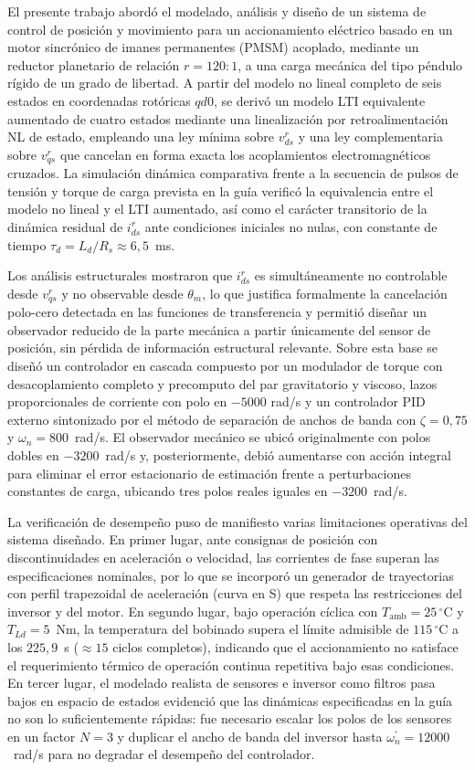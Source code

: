 \documentclass[12pt, a4paper,journal, onecolumn, compsoc]{IEEEtran}
\begin{document}
El presente trabajo abordó el modelado, análisis y diseño de un sistema de control de posición y movimiento para un accionamiento eléctrico basado en un motor sincrónico de imanes permanentes (PMSM) acoplado, mediante un reductor planetario de relación $r=120{:}1$, a una carga mecánica del tipo péndulo rígido de un grado de libertad. A partir del modelo no lineal completo de seis estados en coordenadas rotóricas $qd0$, se derivó un modelo LTI equivalente aumentado de cuatro estados mediante una linealización por retroalimentación NL de estado, empleando una ley mínima sobre $v_{ds}^{r}$ y una ley complementaria sobre $v_{qs}^{r}$ que cancelan en forma exacta los acoplamientos electromagnéticos cruzados. La simulación dinámica comparativa frente a la secuencia de pulsos de tensión y torque de carga prevista en la guía verificó la equivalencia entre el modelo no lineal y el LTI aumentado, así como el carácter transitorio de la dinámica residual de $i_{ds}^{r}$ ante condiciones iniciales no nulas, con constante de tiempo $\tau_d = L_d/R_s \approx 6{,}5$~ms.

Los análisis estructurales mostraron que $i_{ds}^{r}$ es simultáneamente no controlable desde $v_{qs}^{r}$ y no observable desde $\theta_m$, lo que justifica formalmente la cancelación polo-cero detectada en las funciones de transferencia y permitió diseñar un observador reducido de la parte mecánica a partir únicamente del sensor de posición, sin pérdida de información estructural relevante. Sobre esta base se diseñó un controlador en cascada compuesto por un modulador de torque con desacoplamiento completo y precomputo del par gravitatorio y viscoso, lazos proporcionales de corriente con polo en $-5000$ rad/s y un controlador PID externo sintonizado por el método de separación de anchos de banda con $\zeta = 0{,}75$ y $\omega_n = 800$~rad/s. El observador mecánico se ubicó originalmente con polos dobles en $-3200$~rad/s y, posteriormente, debió aumentarse con acción integral para eliminar el error estacionario de estimación frente a perturbaciones constantes de carga, ubicando tres polos reales iguales en $-3200$~rad/s.

La verificación de desempeño puso de manifiesto varias limitaciones operativas del sistema diseñado. En primer lugar, ante consignas de posición con discontinuidades en aceleración o velocidad, las corrientes de fase superan las especificaciones nominales, por lo que se incorporó un generador de trayectorias con perfil trapezoidal de aceleración (curva en S) que respeta las restricciones del inversor y del motor. En segundo lugar, bajo operación cíclica con $T_{\mathrm{amb}}=25\,^\circ$C y $T_{Ld}=5$~Nm, la temperatura del bobinado supera el límite admisible de $115\,^\circ$C a los $225{,}9$~s ($\approx 15$ ciclos completos), indicando que el accionamiento no satisface el requerimiento térmico de operación continua repetitiva bajo esas condiciones. En tercer lugar, el modelado realista de sensores e inversor como filtros pasa bajos en espacio de estados evidenció que las dinámicas especificadas en la guía no son lo suficientemente rápidas: fue necesario escalar los polos de los sensores en un factor $N=3$ y duplicar el ancho de banda del inversor hasta $\omega_n^{\prime}=12000$~rad/s para no degradar el desempeño del controlador.
\end{document}
